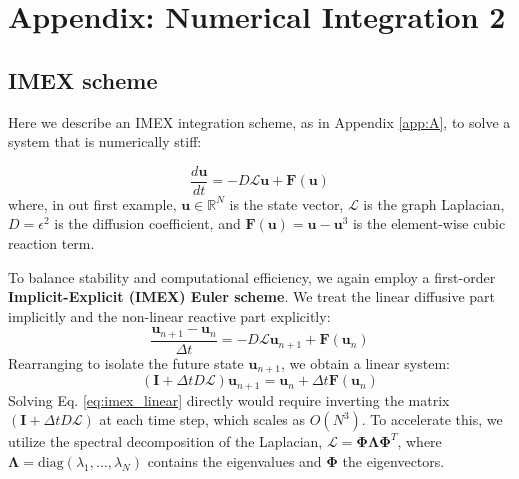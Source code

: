 \chapter{Appendix: Numerical Integration 2}
\label{app:C}

\section{IMEX scheme}
Here we describe an IMEX integration scheme, as in Appendix \ref{app:A}, to solve a system that is numerically stiff:

\begin{equation}
    \frac{d\mathbf{u}}{dt} = -D \mathcal{L} \mathbf{u} + \mathbf{F}(\mathbf{u})
\end{equation}
where, in out first example, $\mathbf{u} \in \mathbb{R}^N$ is the state vector, $\mathcal{L}$ is the graph Laplacian, $D=\epsilon^2$ is the diffusion coefficient, and $\mathbf{F}(\mathbf{u}) = \mathbf{u} - \mathbf{u}^3$ is the element-wise cubic reaction term.


To balance stability and computational efficiency, we again employ a first-order \textbf{Implicit-Explicit (IMEX) Euler scheme}. We treat the linear diffusive part implicitly and the non-linear reactive part explicitly:
\begin{equation}
    \frac{\mathbf{u}_{n+1} - \mathbf{u}_n}{\Delta t} = -D \mathcal{L} \mathbf{u}_{n+1} + \mathbf{F}(\mathbf{u}_n)
\end{equation}
Rearranging to isolate the future state $\mathbf{u}_{n+1}$, we obtain a linear system:
\begin{equation}
    (\mathbf{I} + \Delta t D \mathcal{L}) \mathbf{u}_{n+1} = \mathbf{u}_n + \Delta t \mathbf{F}(\mathbf{u}_n)
    \label{eq:imex_linear}
\end{equation}
Solving Eq. \eqref{eq:imex_linear} directly would require inverting the matrix $(\mathbf{I} + \Delta t D \mathcal{L})$ at each time step, which scales as $O(N^3)$. To accelerate this, we utilize the spectral decomposition of the Laplacian, $\mathcal{L} = \mathbf{\Phi} \mathbf{\Lambda} \mathbf{\Phi}^T$, where $\mathbf{\Lambda} = \text{diag}(\lambda_1, \dots, \lambda_N)$ contains the eigenvalues and $\mathbf{\Phi}$ the eigenvectors.

